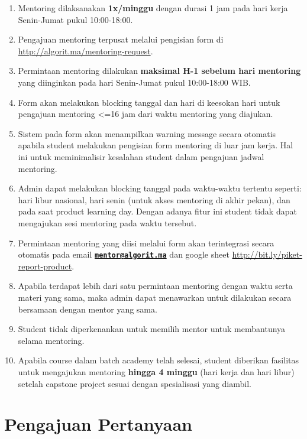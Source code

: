 \documentclass[
]{book}
\providecommand{\tightlist}{%
  \setlength{\itemsep}{0pt}\setlength{\parskip}{0pt}}
\begin{document}
\begin{enumerate}
\def\labelenumi{\arabic{enumi}.}
\tightlist
\item
  Mentoring dilaksanakan \textbf{1x/minggu} dengan durasi 1 jam pada hari kerja Senin-Jumat pukul 10:00-18:00.
\item
  Pengajuan mentoring terpusat melalui pengisian form di \url{http://algorit.ma/mentoring-request}.
\item
  Permintaan mentoring dilakukan \textbf{maksimal H-1 sebelum hari mentoring} yang diinginkan pada hari Senin-Jumat pukul 10:00-18:00 WIB.
\item
  Form akan melakukan blocking tanggal dan hari di keesokan hari untuk pengajuan mentoring \textless=16 jam dari waktu mentoring yang diajukan.
\item
  Sistem pada form akan menampilkan warning message secara otomatis apabila student melakukan pengisian form mentoring di luar jam kerja. Hal ini untuk meminimalisir kesalahan student dalam pengajuan jadwal mentoring.
\item
  Admin dapat melakukan blocking tanggal pada waktu-waktu tertentu seperti: hari libur nasional, hari senin (untuk akses mentoring di akhir pekan), dan pada saat product learning day. Dengan adanya fitur ini student tidak dapat mengajukan sesi mentoring pada waktu tersebut.
\item
  Permintaan mentoring yang diisi melalui form akan terintegrasi secara otomatis pada email \textbf{\href{mailto:mentor@algorit.ma}{\nolinkurl{mentor@algorit.ma}}} dan google sheet \url{http://bit.ly/piket-report-product}.
\item
  Apabila terdapat lebih dari satu permintaan mentoring dengan waktu serta materi yang sama, maka admin dapat menawarkan untuk dilakukan secara bersamaan dengan mentor yang sama.
\item
  Student tidak diperkenankan untuk memilih mentor untuk membantunya selama mentoring.
\item
  Apabila course dalam batch academy telah selesai, student diberikan fasilitas untuk mengajukan mentoring \textbf{hingga 4 minggu} (hari kerja dan hari libur) setelah capstone project sesuai dengan spesialisasi yang diambil.
\end{enumerate}

\hypertarget{pengajuan-pertanyaan}{%
\section{Pengajuan Pertanyaan}\label{pengajuan-pertanyaan}}
\end{document}
